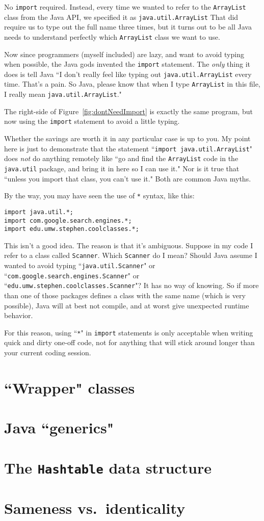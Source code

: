 No \texttt{import} required. Instead, every time we wanted to refer to the
\texttt{ArrayList} class from the Java API, we specified it as
\texttt{java.util.ArrayList} That did require us to type out the full name
three times, but it turns out to be all Java needs to understand perfectly
which \texttt{ArrayList} class we want to use.

Now since programmers (myself included) are lazy, and want to avoid typing
when possible, the Java gods invented the \texttt{import} statement. The
\textit{only} thing it does is tell Java ``I don't really feel like typing out
\texttt{java.util.ArrayList} every time. That's a pain. So Java, please know
that when I type \texttt{ArrayList} in this file, I really mean
\texttt{java.util.ArrayList}."

The right-side of Figure~\ref{fig:dontNeedImport} is exactly the same program,
but now using the \texttt{import} statement to avoid a little typing.

Whether the savings are worth it in any particular case is up to you. My point
here is just to demonstrate that the statement ``\texttt{import
java.util.ArrayList}" does \textit{not} do anything remotely like ``go and
find the \texttt{ArrayList} code in the \texttt{java.util} package, and bring
it in here so I can use it." Nor is it true that ``unless you import that
class, you can't use it." Both are common Java myths.

By the way, you may have seen the use of \texttt{*} syntax, like this:

\begin{Verbatim}[fontsize=\small,samepage=true]
import java.util.*;
import com.google.search.engines.*;
import edu.umw.stephen.coolclasses.*;
\end{Verbatim}

This isn't a good idea. The reason is that it's ambiguous. Suppose in my code
I refer to a class called \texttt{Scanner}. Which \texttt{Scanner} do I mean?
Should Java assume I wanted to avoid typing ``\texttt{java.util.Scanner}" or
``\texttt{com.google.search.engines.Scanner}" or
``\texttt{edu.umw.stephen.coolclasses.Scanner}"? It has no way of knowing. So
if more than one of those packages defines a class with the same name (which
is very possible), Java will at best not compile, and at worst give unexpected
runtime behavior.

For this reason, using ``\texttt{*}" in \texttt{import} statements is only
acceptable when writing quick and dirty one-off code, not for anything that
will stick around longer than your current coding session.

\section{``Wrapper" classes}


\section{Java ``generics"}

\section{The \texttt{Hashtable} data structure}

\section{Sameness vs.~identicality}
